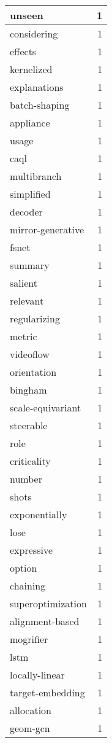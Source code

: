 \begin{table}[h]
\begin{tabular}{|l|r|}
\hline
unseen & 1 \\
\hline
considering & 1 \\
\hline
effects & 1 \\
\hline
kernelized & 1 \\
\hline
explanations & 1 \\
\hline
batch-shaping & 1 \\
\hline
appliance & 1 \\
\hline
usage & 1 \\
\hline
caql & 1 \\
\hline
multibranch & 1 \\
\hline
simplified & 1 \\
\hline
decoder & 1 \\
\hline
mirror-generative & 1 \\
\hline
fsnet & 1 \\
\hline
summary & 1 \\
\hline
salient & 1 \\
\hline
relevant & 1 \\
\hline
regularizing & 1 \\
\hline
metric & 1 \\
\hline
videoflow & 1 \\
\hline
orientation & 1 \\
\hline
bingham & 1 \\
\hline
scale-equivariant & 1 \\
\hline
steerable & 1 \\
\hline
role & 1 \\
\hline
criticality & 1 \\
\hline
number & 1 \\
\hline
shots & 1 \\
\hline
exponentially & 1 \\
\hline
lose & 1 \\
\hline
expressive & 1 \\
\hline
option & 1 \\
\hline
chaining & 1 \\
\hline
superoptimization & 1 \\
\hline
alignment-based & 1 \\
\hline
mogrifier & 1 \\
\hline
lstm & 1 \\
\hline
locally-linear & 1 \\
\hline
target-embedding & 1 \\
\hline
allocation & 1 \\
\hline
geom-gcn & 1 \\

\end{tabular}
\end{table}
